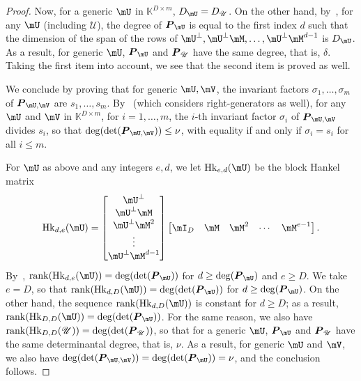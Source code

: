 \documentclass[12pt]{article}
\newcommand{\mat}[1]{\bm{\MakeUppercase{#1}}} %
\def\K{\mathbb{K}}
\def\K {\ensuremath{\mathbb{K}}}
\def\scrU {\ensuremath{\mathscr{U}}}
\def\scrV {\ensuremath{\mathscr{V}}}
\begin{document}
\begin{proof}
  Now, for a generic $\mU$ in $\K^{D\times m}$, $D_\mU=D_\scrU$. On
  the other hand, by~\cite[Lemma~4.3]{Villard97a}, for any $\mU$
  (including $\scrU$), the degree of $\mat{P}_{\mU}$ is equal to the
  first index $d$ such that the dimension of the span of the rows of
  $\mU^\perp,\mU^\perp \mM,\dots, \mU^\perp \mM^{d-1}$ is $D_\mU$. As
  a result, for generic $\mU$, $\mat{P}_{\mU}$ and $\mat{P}_{\scrU}$
  have the same degree, that is, $\delta$.  Taking the first item into
  account, we see that the second item is proved as well.
	
  We conclude by proving that for generic $\mU,\mV$, the invariant
  factors $\sigma_1,\dots,\sigma_m$ of $\mat{P}_{\mU,\mV}$ are
  $s_1,\dots,s_m$.  By~\cite[Theorem~2.12]{KaVi04} (which considers 
  right-generators as well), for any $\mU$ and
  $\mV$ in $\K^{D\times m}$, for $i=1,\dots,m$, the $i$-th invariant
  factor $\sigma_i$ of $\mat{P}_{\mU,\mV}$ divides $s_i$, so that
  $\deg(\det(\mat{P}_{\mU,\mV}))\le\nu$, with equality if and only
  if $\sigma_i=s_i$ for all $i \le m$.
	
  For $\mU$ as above and any integers $e,d$, we let ${\rm
    Hk}_{e,d}(\mU)$ be the block Hankel matrix
  $$ {\rm Hk}_{d,e}(\mU) =
  \begin{bmatrix}
    \mU^\perp \\     \mU^\perp \mM \\     \mU^\perp \mM^2 \\ \vdots  \\      \mU^\perp\mM^{d-1}
  \end{bmatrix}
  \begin{bmatrix}
    \mI_D & \mM & \mM^2 &\cdots& \mM^{e-1}
  \end{bmatrix}.
  $$ By~\cite[Eq.~(2.6)]{KaVi04}, ${\rm rank}({\rm Hk}_{d,e}(\mU)) =
  \deg(\det(\mat{P}_{\mU}))$ for $d \ge \deg(\mat{P}_{\mU})$
  and $e \ge D$.  We take $e=D$, so that ${\rm rank}({\rm
    Hk}_{d,D}(\mU)) = \deg(\det(\mat{P}_{\mU}))$ for $d \ge
  \deg(\mat{P}_{\mU})$. On the other hand, the sequence ${\rm
    rank}({\rm Hk}_{d,D}(\mU))$ is constant for $d \ge D$; as a
  result, ${\rm rank}({\rm Hk}_{D,D}(\mU)) =
  \deg(\det(\mat{P}_{\mU}))$. For the same reason, we also have ${\rm
    rank}({\rm Hk}_{D,D}(\scrU)) = \deg(\det(\mat{P}_{\scrU}))$, so that
  for a generic $\mU$, $\mat{P}_{\mU}$ and $\mat{P}_{\scrU}$
  have the same determinantal degree, that is, $\nu$.  As a result,
  for generic $\mU$ and $\mV$, we also have
  $\deg(\det(\mat{P}_{\mU,\mV}))=\deg(\det(\mat{P}_{\mU}))=\nu$, and the conclusion follows.
\end{proof} 
\end{document}
